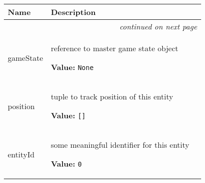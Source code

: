     \vspace{-1cm}
\hspace{\varindent}\begin{longtable}{|p{\varnamewidth}|p{\vardescrwidth}|l}
\cline{1-2}
\cline{1-2} \centering \textbf{Name} & \centering \textbf{Description}& \\
\cline{1-2}
\endhead\cline{1-2}\multicolumn{3}{r}{\small\textit{continued on next page}}\\\endfoot\cline{1-2}
\endlastfoot\raggedright g\-a\-m\-e\-S\-t\-a\-t\-e\- & \raggedright reference to master game state object

\textbf{Value:} 
{\tt None}&\\
\cline{1-2}
\raggedright p\-o\-s\-i\-t\-i\-o\-n\- & \raggedright tuple to track position of this entity

\textbf{Value:} 
{\tt []}&\\
\cline{1-2}
\raggedright e\-n\-t\-i\-t\-y\-I\-d\- & \raggedright some meaningful identifier for this entity

\textbf{Value:} 
{\tt 0}&\\
\cline{1-2}
\end{longtable}

